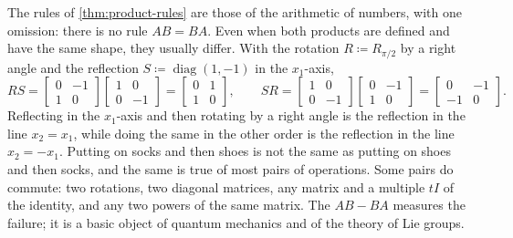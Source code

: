 The rules of \cref{thm:product-rules} are those of the arithmetic of numbers, with one omission: there is no rule $AB=BA$. Even when both products are defined and have the same shape, they usually differ. With the rotation $R\coloneqq R_{\pi/2}$ by a right angle and the reflection $S\coloneqq\operatorname{diag}(1,-1)$ in the $x_1$-axis,
\[
RS=\begin{bmatrix}0&-1\\1&0\end{bmatrix}\begin{bmatrix}1&0\\0&-1\end{bmatrix}=\begin{bmatrix}0&1\\1&0\end{bmatrix},\qquad SR=\begin{bmatrix}1&0\\0&-1\end{bmatrix}\begin{bmatrix}0&-1\\1&0\end{bmatrix}=\begin{bmatrix}0&-1\\-1&0\end{bmatrix}.
\]
Reflecting in the $x_1$-axis and then rotating by a right angle is the reflection in the line $x_2=x_1$, while doing the same in the other order is the reflection in the line $x_2=-x_1$. Putting on socks and then shoes is not the same as putting on shoes and then socks, and the same is true of most pairs of operations. Some pairs do commute: two rotations, two diagonal matrices, any matrix and a multiple $tI$ of the identity, and any two powers of the same matrix. The  $AB-BA$ measures the failure; it is a basic object of quantum mechanics and of the theory of Lie groups.

